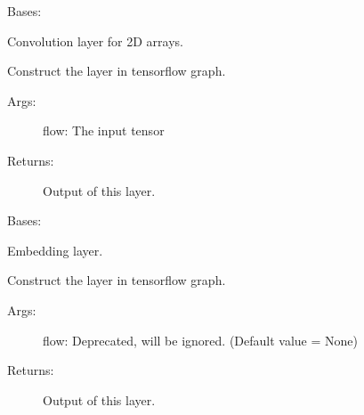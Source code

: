\documentclass[letterpaper,10pt,english]{sphinxmanual}
\begin{document}
\begin{fulllineitems}
\label{legonet:legonet.layers.Convolution}
Bases: {\hyperref[legonet:legonet.layers.Layer]{\emph{}}}

Convolution layer for 2D arrays.

\begin{fulllineitems}
\label{legonet:legonet.layers.Convolution.call}
Construct the layer in tensorflow graph.
\begin{description}
\item[{Args:}] \leavevmode
flow: The input tensor

\item[{Returns:}] \leavevmode
Output of this layer.

\end{description}

\end{fulllineitems}


\end{fulllineitems}


\begin{fulllineitems}
\label{legonet:legonet.layers.Embedding}
Bases: {\hyperref[legonet:legonet.layers.Layer]{\emph{}}}

Embedding layer.

\begin{fulllineitems}
\label{legonet:legonet.layers.Embedding.call}
Construct the layer in tensorflow graph.
\begin{description}
\item[{Args:}] \leavevmode
flow: Deprecated, will be ignored. (Default value = None)

\item[{Returns:}] \leavevmode
Output of this layer.

\end{description}

\end{fulllineitems}


\end{fulllineitems}
\end{document}
